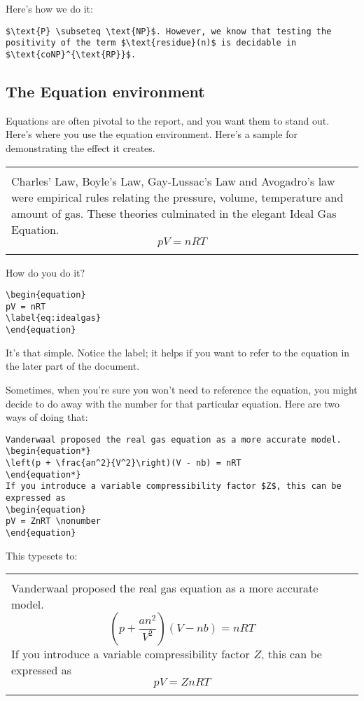 \documentclass[12pt, letterpaper]{article}
\theoremstyle{remark}
\renewenvironment{boxed}
    {\begin{center}
    \begin{tabular}{|p{0.9\textwidth}|}
    \hline\\
    }
    { 
    \\\\\hline
    \end{tabular} 
    \end{center}
    }
\begin{document}
Here's how we do it:
\begin{lstlisting}
$\text{P} \subseteq \text{NP}$. However, we know that testing the positivity of the term $\text{residue}(n)$ is decidable in $\text{coNP}^{\text{RP}}$.
\end{lstlisting}

\subsection{The Equation environment}
Equations are often pivotal to the report, and you want them to stand out. Here's where you use the equation environment. Here's a sample for demonstrating the effect it creates.
\begin{boxed}
Charles' Law, Boyle's Law, Gay-Lussac's Law and Avogadro's law were empirical rules relating the pressure, volume, temperature and amount of gas. These theories culminated in the elegant Ideal Gas Equation.
\begin{equation}
pV = nRT
\label{eq:idealgas}
\end{equation}
\end{boxed}
How do you do it?
\begin{lstlisting}
\begin{equation}
pV = nRT
\label{eq:idealgas}
\end{equation}
\end{lstlisting}
It's that simple. Notice the label; it helps if you want to refer to the equation in the later part of the document. 

Sometimes, when you're sure you won't need to reference the equation, you might decide to do away with the number for that particular equation. Here are two ways of doing that:

\newpage


\newpage


\begin{lstlisting}
Vanderwaal proposed the real gas equation as a more accurate model.
\begin{equation*}
\left(p + \frac{an^2}{V^2}\right)(V - nb) = nRT
\end{equation*}
If you introduce a variable compressibility factor $Z$, this can be expressed as
\begin{equation}
pV = ZnRT \nonumber
\end{equation}
\end{lstlisting}

This typesets to:
\begin{boxed}
Vanderwaal proposed the real gas equation as a more accurate model.
\begin{equation*}
\left(p + \frac{an^2}{V^2}\right)(V - nb) = nRT
\end{equation*}
If you introduce a variable compressibility factor $Z$, this can be expressed as
\begin{equation}
pV = ZnRT \nonumber
\end{equation}
\end{boxed}
\end{document}
